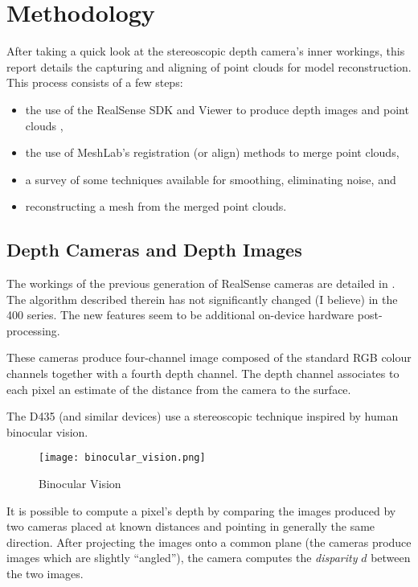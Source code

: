 \section{Methodology}
After taking a quick look at the stereoscopic depth camera's inner workings, this
report details the capturing and aligning of point clouds for model reconstruction.
This process consists of a few steps:

 \begin{itemize}
   \item the use of the RealSense SDK and Viewer to produce depth images and point clouds \cite{librealsense},
   \item the use of MeshLab's registration (or align) methods to merge point clouds,
   \item a survey of some techniques available for smoothing, eliminating noise, and
   \item reconstructing a mesh from the merged point clouds.
 \end{itemize}


 \subsection{Depth Cameras and Depth Images}
  The workings of the previous generation of RealSense cameras are detailed in \cite{keselman2017intel}.
 The algorithm described therein has not significantly changed (I believe) in the 400 series.
 The new features seem to be additional on-device hardware post-processing.

 These cameras produce four-channel image composed of the standard RGB colour channels together with a fourth depth channel. The depth channel associates to each pixel an estimate of the distance from the camera to the surface.

 The D435 (and similar devices) use a stereoscopic technique inspired by human
 binocular vision.

 \begin{figure}[H]
  \centering
  \texttt{[image: binocular\_vision.png]}
  \caption{Binocular Vision}
  \end{figure}

 It is possible to compute a pixel's depth by comparing the images produced by two cameras placed at known distances and pointing in generally the same direction. After projecting the images onto a common plane (the cameras produce images which are slightly ``angled''), the camera computes the \textit{disparity}
  $d$ between the two images.


